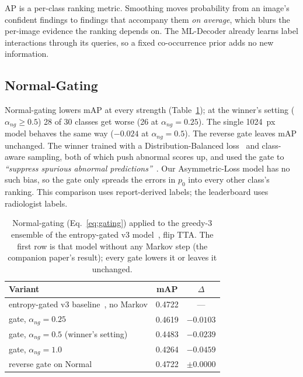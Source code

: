 \documentclass[conference]{IEEEtran}
\begin{document}
AP is a per-class ranking metric. Smoothing moves probability from an image's confident findings to findings that accompany them \emph{on average}, which blurs the per-image evidence the ranking depends on. The ML-Decoder already learns label interactions through its queries, so a fixed co-occurrence prior adds no new information.

\subsection{Normal-Gating}
Normal-gating lowers mAP at every strength (Table~\ref{tab:gating}); at the winner's setting ($\alpha_{ng} \ge 0.5$) 28 of 30 classes get worse (26 at $\alpha_{ng} = 0.25$). The single 1024~px model behaves the same way ($-0.024$ at $\alpha_{ng} = 0.5$). The reverse gate leaves mAP unchanged. The winner trained with a Distribution-Balanced loss~\cite{b23} and class-aware sampling, both of which push abnormal scores up, and used the gate to \emph{``suppress spurious abnormal predictions''}~\cite{b15}. Our Asymmetric-Loss model has no such bias, so the gate only spreads the errors in $p_0$ into every other class's ranking. This comparison uses report-derived labels; the leaderboard uses radiologist labels.

\begin{table}[htbp]
\caption{Normal-gating (Eq.~\eqref{eq:gating}) applied to the greedy-3 ensemble of the entropy-gated v3 model~\cite{b25}, flip TTA. The first row is that model without any Markov step (the companion paper's result); every gate lowers it or leaves it unchanged.}
\begin{center}
\begin{tabular}{|l|c|c|}
\hline
\textbf{Variant} & \textbf{mAP} & \textbf{$\Delta$} \\
\hline
entropy-gated v3 baseline~\cite{b25}, no Markov & 0.4722 & --- \\
\hline
gate, $\alpha_{ng} = 0.25$ & 0.4619 & $-0.0103$ \\
\hline
gate, $\alpha_{ng} = 0.5$ (winner's setting) & 0.4483 & $-0.0239$ \\
\hline
gate, $\alpha_{ng} = 1.0$ & 0.4264 & $-0.0459$ \\
\hline
reverse gate on Normal & 0.4722 & $\pm 0.0000$ \\
\hline
\end{tabular}
\label{tab:gating}
\end{center}
\end{table}
\end{document}
